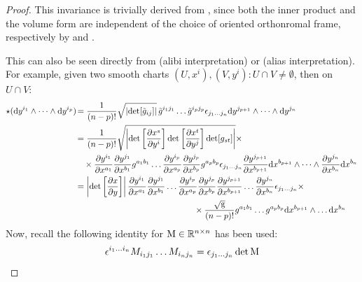 \begin{proofbox}
  \begin{proof}
    This invariance is trivially derived from , since both the inner product and the volume form are independent of the choice of oriented orthonromal frame, respectively by  and .

    This can also be seen directly from  (alibi interpretation) or  (alias interpretation). For example, given two smooth charts $ (U,x^i) , (V,y^i) : U \cap V \neq \emptyset $, then on $ U \cap V $:
    \begin{equation*}
      \begin{split}
        \star (\mathrm{d} y^{i_1} \wedge \dots \wedge \mathrm{d} y^{i_p}) \hspace{-0.15em}
        & = \frac{1}{(n-p)!} \sqrt{\left\lvert\det [\tilde{g}_{ij}]\right\rvert} \, \tilde{g}^{i_1 j_1} \dots \tilde{g}^{i_p j_p} \epsilon_{j_1 \dots j_n} \mathrm{d} y^{j_{p+1}} \wedge \dots \wedge \mathrm{d} y^{j_n} \\
        & = \frac{1}{(n-p)!} \sqrt{\left\lvert\det \left[ \frac{\partial x^s}{\partial y^i} \right] \det \left[ \frac{\partial x^t}{\partial y^j} \right] \det [g_{st}]\right\rvert} \times \\
        & \quad \times \frac{\partial y^{i_1}}{\partial x^{a_1}} \frac{\partial y^{j_1}}{\partial x^{b_1}} g^{a_1 b_1} \dots \frac{\partial y^{i_p}}{\partial x^{a_p}} \frac{\partial y^{j_p}}{\partial x^{b_p}} g^{a_p b_p} \epsilon_{j_1 \dots j_n} \frac{\partial y^{j_{p+1}}}{\partial x^{b_{p+1}}} \mathrm{d} x^{b_{p+1}} \wedge \dots \wedge \frac{\partial y^{j_n}}{\partial x^{b_n}} \mathrm{d} x^{b_n} \\
        & = \left\lvert\det \left[ \frac{\partial x}{\partial y} \right]\right\rvert \frac{\partial y^{i_1}}{\partial x^{a_1}} \frac{\partial y^{j_1}}{\partial x^{b_1}} \dots \frac{\partial y^{i_p}}{\partial x^{a_p}} \frac{\partial y^{j_p}}{\partial x^{b_p}} \frac{\partial y^{j_{p+1}}}{\partial x^{b_{p+1}}} \dots \frac{\partial y^{j_n}}{\partial x^{b_n}} \epsilon_{j_1 \dots j_n} \times \\
        & \qquad \qquad \qquad \qquad \qquad \qquad \qquad \times \frac{\sqrt{\mathrm{g}}}{(n-p)!} g^{a_1 b_1} \dots g^{a_p b_p} \mathrm{d} x^{b_{p+1}} \wedge \dots \mathrm{d} x^{b_n} \\
      \end{split}
    \end{equation*}
    Now, recall the following identity for $ \mathrm{M} \in \mathbb{R}^{n \times n} $ has been used:
    \begin{equation}
      \epsilon^{i_1 \dots i_n} M_{i_1 j_1} \dots M_{i_n j_n} = \epsilon_{j_1 \dots j_n} \det \mt{M}

\end{equation}
\end{proof}
\end{proofbox}
